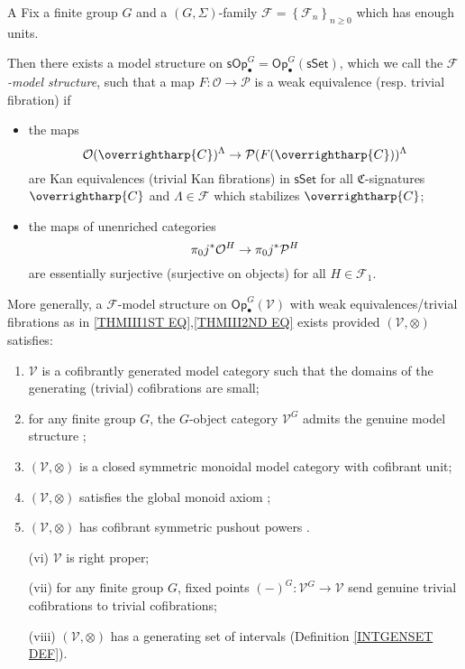 \documentclass[a4paper,10pt
,draft
]{article}%
\numberwithin{equation}{section}
\numberwithin{figure}{section}
\theoremstyle{definition} %
\newcommand{\set}[1]{\left\{#1\right\}}%
\newcommand{\vect}[1]{\text{\overrightharp{\ensuremath{#1}}}}
\newcommand{\Op}{\mathsf{Op}}%
\newcommand{\F}{\ensuremath{\mathcal F}}
\newcommand{\V}{\ensuremath{\mathcal V}}
\renewcommand{\O}{\ensuremath{\mathcal O}}
\newcommand{\1}{\ensuremath{\mathbbm 1}}%
\begin{document}
\begin{customthm}{A}\label{THMA}
Fix a finite group $G$ 
and a $(G,\Sigma)$-family $\F = \set{\F_n}_{n \geq 0}$
which has enough units.

Then there exists a model structure on
$\mathsf{sOp}^G_{\bullet} = 
\mathsf{Op}^G_{\bullet}(\mathsf{sSet})$,
which we call the \emph{$\F$-model structure},
such that a map
$F\colon \mathcal{O} \to \mathcal{P}$
is a weak equivalence (resp. trivial fibration) if
\begin{itemize}
\item the maps
\begin{equation}\label{THMIII1ST EQ}
	\O(\vect{C})^{\Lambda} \to \mathcal{P}(F(\vect{C}))^{\Lambda}
\end{equation}
are Kan equivalences (trivial Kan fibrations)
in $\mathsf{sSet}$
for all $\mathfrak{C}$-signatures $\vect{C}$
and $\Lambda \in \F$ which stabilizes $\vect{C}$;
\item 
the maps of unenriched categories
\begin{equation}\label{THMIII2ND EQ}
\pi_0 j^{\**} \O^H 
\to 
\pi_0 j^{\**} \mathcal{P}^H 
\end{equation}
are essentially surjective (surjective on objects)
for all $H \in \F_1$.
\end{itemize}
More generally, a $\F$-model structure on 
$\Op^G_{\bullet}(\V)$
with weak equivalences/trivial fibrations as in 
\eqref{THMIII1ST EQ},\eqref{THMIII2ND EQ}
exists provided $(\V,\otimes)$ satisfies:
\begin{enumerate}[label = (\roman*)]
	\item $\V$ is a cofibrantly generated model category
	such that the domains of the generating (trivial) cofibrations are small;
	\item for any finite group $G$, the $G$-object category $\V^G$ admits the genuine model structure 
	\cite[Def. \ref{OC-GENMOD DEF}]{BP_FCOP};
	\item $(\V, \otimes)$ is a closed symmetric monoidal model category with cofibrant unit;
	\item $(\V, \otimes)$ satisfies the global monoid axiom \cite[Def. \ref{OC-GLOBMONAX_DEF}]{BP_FCOP};
	\item $(\V, \otimes)$ has cofibrant symmetric pushout powers \cite[Def. \ref{OC-CSPP_DEF}]{BP_FCOP}.
	\item[(vi)] $\V$ is right proper;
	\item[(vii)]
	for any finite group $G$, fixed points
	$(-)^{G} \colon \V^G \to \V$
	send genuine trivial cofibrations to trivial cofibrations;
	\item[(viii)] $(\V, \otimes)$ has a generating set of intervals
	(Definition \ref{INTGENSET DEF}).
\end{enumerate}
\end{customthm}
\end{document}
